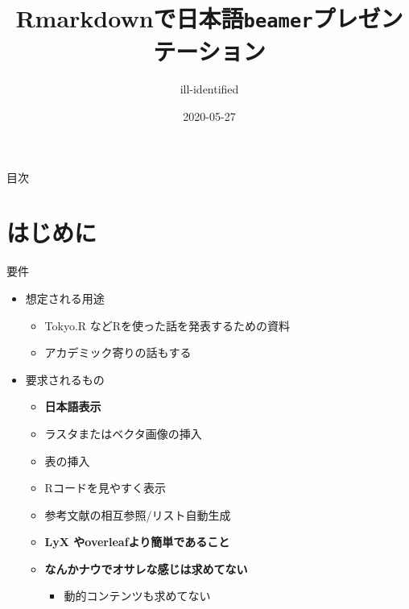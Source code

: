 \documentclass[14pt,ignorenonframetext,]{beamer}
\title{Rmarkdownで日本語\texttt{beamer}プレゼンテーション}
\author{ill-identified}
\date{2020-05-27}
\providecommand{\tightlist}{%
  \setlength{\itemsep}{0pt}\setlength{\parskip}{0pt}}
\begin{document}
\frame{\titlepage}

\begin{frame}{目次}
\protect\hypertarget{ux76eeux6b21}{}

\tableofcontents{}

\end{frame}

\hypertarget{ux306fux3058ux3081ux306b}{%
\section{はじめに}\label{ux306fux3058ux3081ux306b}}

\begin{frame}{要件}
\protect\hypertarget{ux8981ux4ef6}{}

\begin{itemize}
\tightlist
\item
  想定される用途

  \begin{itemize}
  \tightlist
  \item
    Tokyo.R などRを使った話を発表するための資料
  \item
    アカデミック寄りの話もする
  \end{itemize}
\item
  要求されるもの

  \begin{itemize}
  \tightlist
  \item
    \textbf{日本語表示}
  \item
    ラスタまたはベクタ画像の挿入
  \item
    表の挿入
  \item
    Rコードを見やすく表示
  \item
    参考文献の相互参照/リスト自動生成
  \item
    \textbf{LyX やoverleafより簡単であること}
  \item
    \textbf{なんかナウでオサレな感じは求めてない}

    \begin{itemize}
    \tightlist
    \item
      動的コンテンツも求めてない
    \end{itemize}
  \end{itemize}
\end{itemize}

\end{frame}
\end{document}
